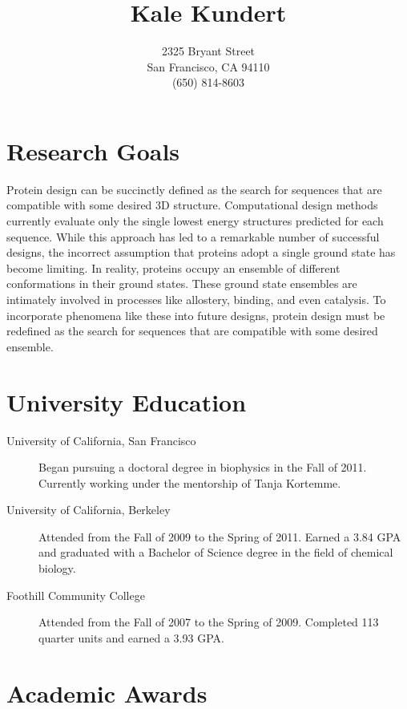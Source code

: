 \documentclass{article}
\title{Kale Kundert}
\author{2325 Bryant Street\\San Francisco, CA 94110\\(650) 814-8603}
\date{}
\begin{document}
 \maketitle

 \pagestyle{empty}
 \thispagestyle{empty}

 \section*{Research Goals}

  Protein design can be succinctly defined as the search for sequences that are 
  compatible with some desired 3D structure.  Computational design methods 
  currently evaluate only the single lowest energy structures predicted for 
  each sequence.  While this approach has led to a remarkable number of 
  successful designs, the incorrect assumption that proteins adopt a single 
  ground state has become limiting.  In reality, proteins occupy an ensemble of 
  different conformations in their ground states.  These ground state ensembles 
  are intimately involved in processes like allostery, binding, and even 
  catalysis.  To incorporate phenomena like these into future designs, protein 
  design must be redefined as the search for sequences that are compatible with 
  some desired ensemble.

 \section*{University Education}

  \begin{description}
   \item[University of California, San Francisco] Began pursuing a doctoral 
   degree in biophysics in the Fall of 2011.  Currently working under the 
   mentorship of Tanja Kortemme.
   
   \item[University of California, Berkeley] Attended from the Fall of 2009 to
   the Spring of 2011.  Earned a 3.84 GPA and graduated with a Bachelor of 
   Science degree in the field of chemical biology.
   
   \item[Foothill Community College] Attended from the Fall of 2007 to the
   Spring of 2009.  Completed 113 quarter units and earned a 3.93 GPA.
  \end{description}

 \section*{Academic Awards}
\end{document}
